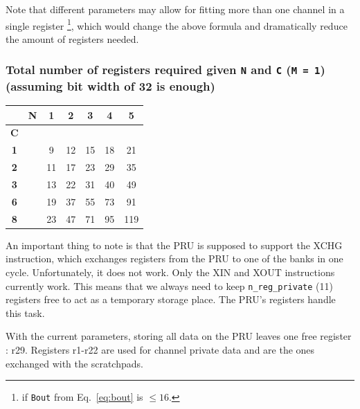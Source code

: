 \documentclass[]{report}
\begin{document}
Note that different parameters may allow for fitting more than one
channel in a single register \footnote{if \texttt{B\textunderscore out} from Eq.~\ref{eq:bout} is $ \leq 16 $.}, which would change the above formula and
dramatically reduce the amount of registers needed.




\hypertarget{total-number-of-registers-required-given-n-and-c-m-1-assuming-bit-width-of-32-is-enough}{%
\subsubsection{\texorpdfstring{Total number of registers required given
\texttt{N} and \texttt{C} (\texttt{M\ =\ 1}) (assuming bit width of 32
is
enough)}{Total number of registers required given N and C (M = 1) (assuming bit width of 32 is enough)}}\label{total-number-of-registers-required-given-n-and-c-m-1-assuming-bit-width-of-32-is-enough}}

\begin {table}[H]
\begin{center}
\begin{tabular}{|c|c|c|c|c|c|c|}
	\hline  & \textbf{N} & \textbf{1} & \textbf{2} & \textbf{3} & \textbf{4} & \textbf{5} \\ 
	\hline \textbf{C} & & & & & & \\ 
	\hline  \textbf{1} & & 9 & 12 & 15 & 18 & 21 \\ 
	\hline \textbf{2} & & 11 & 17 & 23 & 29 & 35 \\ 
	\hline  \textbf{3} & & 13 & 22 & 31 & 40 & 49  \\ 
	\hline \textbf{6} & & 19 & 37 & 55 & 73 & 91 \\ 
	\hline \textbf{8} & & 23 & 47 & 71 & 95 & 119  \\ 
	\hline 
\end{tabular} 
\end{center}
\end {table}


An important thing to note is that the PRU is supposed to support the
XCHG instruction, which exchanges registers from the PRU to one of the
banks in one cycle. Unfortunately, it does not work. Only the XIN and
XOUT instructions currently work. This means that we always need to keep
\texttt{n\_reg\_private} (11) registers free to act as a temporary
storage place. The PRU's registers handle this task.

With the current parameters, storing all data on the PRU leaves one free
register : r29. Registers r1-r22 are used for channel private data and
are the ones exchanged with the scratchpads.
\end{document}
